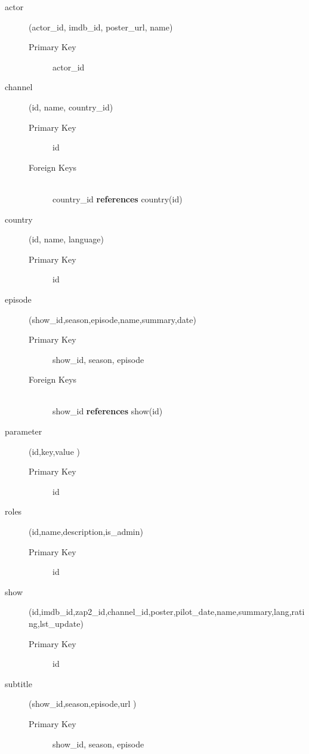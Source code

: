 \begin{description}
	\item[actor] (actor\_id, imdb\_id, poster\_url, name)
		\begin{description}
			\item[Primary Key] actor\_id
		\end{description}
	\item[channel] (id, name, country\_id)
		\begin{description}
			\item[Primary Key] id
			\item[Foreign Keys] \hfill \\ country\_id \textbf{references} country(id)
		\end{description}	
	\item[country] (id, name, language)
		\begin{description}
			\item[Primary Key] id
		\end{description}
	\item[episode] (show\_id,season,episode,name,summary,date)
		\begin{description}
			\item[Primary Key] show\_id, season, episode
			\item[Foreign Keys] \hfill \\ show\_id \textbf{references} show(id)
		\end{description}
	\item[parameter] (id,key,value )
		\begin{description}
			\item[Primary Key] id
		\end{description}
	\item[roles] (id,name,description,is\_admin)
		\begin{description}
			\item[Primary Key] id
		\end{description}
	\item[show] (id,imdb\_id,zap2\_id,channel\_id,poster,pilot\_date,name,summary,lang,rating,lst\_update)
		\begin{description}
			\item[Primary Key] id
		\end{description}
	\item[subtitle] (show\_id,season,episode,url )
		\begin{description}
			\item[Primary Key] show\_id, season, episode

\end{description}
\end{description}
